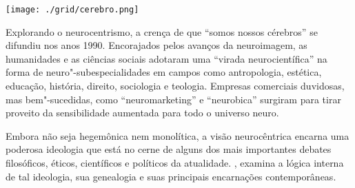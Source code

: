 \pagebreak %

\begin{center}
\hspace*{-3.6cm}
\hspace*{3.1cm}\texttt{[image: ./grid/cerebro.png]}
\end{center}

\hspace*{-7cm}\hrulefill\hspace*{-7cm}

\medskip

\noindent{}Explorando o neurocentrismo, a crença de que “somos nossos cérebros” se difundiu nos anos 1990. Encorajados pelos avanços da neuroimagem, as humanidades e as ciências sociais adotaram uma “virada neurocientífica” na forma de neuro"-subespecialidades em campos como antropologia, estética, educação, história, direito, sociologia e teologia. Empresas comerciais duvidosas, mas bem"-sucedidas, como “neuromarketing” e “neurobica” surgiram para tirar proveito da sensibilidade aumentada para todo o universo neuro.

Embora não seja hegemônica nem monolítica, a visão neurocêntrica encarna uma poderosa ideologia que está no cerne de alguns dos mais importantes debates filosóficos, éticos, científicos e políticos da atualidade. , examina a lógica interna de tal ideologia, sua genealogia e suas principais encarnações contemporâneas. 


\vfill

\hspace*{-.4cm}\begin{minipage}[c]{1\linewidth}
\small{
{}}
\end{minipage}

